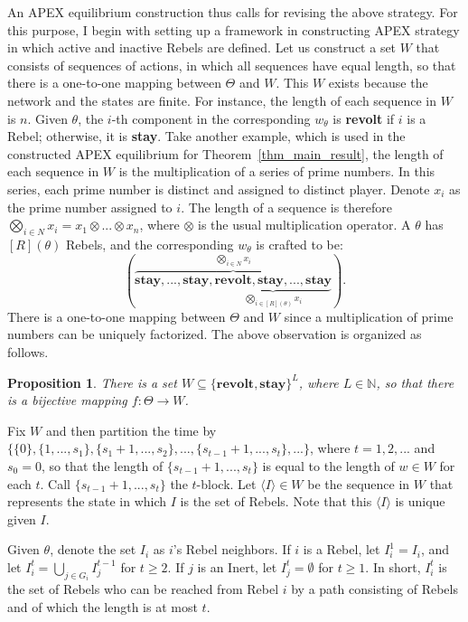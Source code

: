 \documentclass[12pt,letter]{article}
\newtheorem{proposition}{Proposition}[section]
\theoremstyle{definition}
\theoremstyle{remark}
\theoremstyle{claim}
\begin{document}
An APEX equilibrium construction thus calls for revising the above strategy. For this purpose, I begin with setting up a framework in constructing APEX strategy in which active and inactive Rebels are defined. Let us construct a set $W$ that consists of sequences of actions, in which all sequences have equal length, so that there is a one-to-one mapping between $\Theta$ and $W$. This $W$ exists because the network and the states are finite. For instance, the length of each sequence in $W$ is $n$. Given $\theta$, the $i$-th component in the corresponding $w_{\theta}$ is \textbf{revolt} if $i$ is a Rebel; otherwise, it is \textbf{stay}. Take another example, which is used in the constructed APEX equilibrium for Theorem~\ref{thm_main_result}, the length of each sequence in $W$ is the multiplication of a series of prime numbers. In this series, each prime number is distinct and assigned to distinct player. Denote $x_i$ as the prime number assigned to $i$. The length of a sequence is therefore $\bigotimes_{i\in N}x_i=x_1\otimes...\otimes x_n$, where $\otimes$ is the usual multiplication operator. A $\theta$ has $[R](\theta)$ Rebels, and the corresponding $w_{\theta}$ is crafted to be:  
\[(\overbrace{\textbf{stay},...,\textbf{stay},\underbrace{\textbf{revolt},\textbf{stay},...,\textbf{stay}}_{\bigotimes_{i\in [R](\theta)}x_i}}^{\bigotimes_{i\in N} x_i}).\]
There is a one-to-one mapping between $\Theta$ and ${W}$ since a multiplication of prime numbers can be uniquely factorized. The above observation is organized as follows.

\begin{proposition}
There is a set $W\subseteq \{\textbf{revolt},\textbf{stay}\}^L$, where $L\in \mathbb{N}$, so that there is a bijective mapping $f: \Theta \rightarrow W$.
\end{proposition}

Fix $W$ and then partition the time by $\{\{0\},\{1,...,s_1\},\{s_1+1,...,s_2\},...,\{s_{t-1}+1,...,s_t\},...\}$, where $t=1,2,...$ and $s_{0}=0$, so that the length of $\{s_{t-1}+1,...,s_t\}$ is equal to the length of $w\in W$ for each $t$. Call $\{s_{t-1}+1,...,s_t\}$ the $t$-block. Let $\langle I \rangle\in W$ be the sequence in $W$ that represents the state in which $I$ is the set of Rebels. Note that this $\langle I \rangle$ is unique given $I$.

Given $\theta$, denote the set $I_i$ as $i$'s Rebel neighbors. If $i$ is a Rebel, let $I^1_i= I_i$, and let $I^t_i= \bigcup_{j\in G_i} I^{t-1}_j$ for $t\geq 2$. If $j$ is an Inert, let $I^t_j=\emptyset$ for $t\geq 1$. In short, $I^t_i$ is the set of Rebels who can be reached from Rebel $i$ by a path consisting of Rebels and of which the length is at most $t$.
\end{document}

